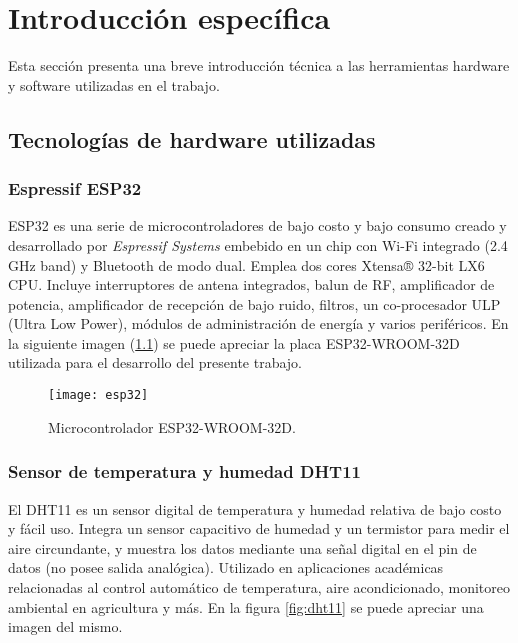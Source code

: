 

\chapter{Introducción específica} %

\label{Chapter2}

Esta sección presenta una breve introducción técnica a las herramientas hardware y software utilizadas en el trabajo.

\section{Tecnologías de hardware utilizadas}

\subsection{Espressif ESP32}


ESP32 es una serie de microcontroladores de bajo costo y bajo consumo creado y desarrollado por \textit{Espressif Systems} embebido en un chip con Wi-Fi integrado (2.4 GHz band) y Bluetooth de modo dual. Emplea dos cores Xtensa® 32-bit LX6 CPU. Incluye interruptores de antena integrados, balun de RF, amplificador de potencia, amplificador de recepción de bajo ruido, filtros, un co-procesador ULP (Ultra Low Power),  módulos de administración de energía y varios periféricos.
En la siguiente imagen (\ref{fig:esp32}) se puede apreciar la placa ESP32-WROOM-32D utilizada para el desarrollo del presente trabajo.

\begin{figure}[h]
    \centering
    \texttt{[image: esp32]}
    \caption{Microcontrolador ESP32-WROOM-32D.}
    \label{fig:esp32}
\end{figure}


\subsection{Sensor de temperatura y humedad DHT11}

El DHT11 es un sensor digital de temperatura y humedad relativa de bajo costo y fácil uso. Integra un sensor capacitivo de humedad y un termistor para medir el aire circundante, y muestra los datos mediante una señal digital en el pin de datos (no posee salida analógica). Utilizado en aplicaciones académicas relacionadas al control automático de temperatura, aire acondicionado, monitoreo ambiental en agricultura y más. En la figura \ref{fig:dht11} se puede apreciar una imagen del mismo.

